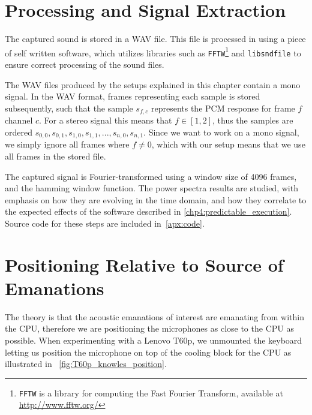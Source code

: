 \section{Processing and Signal Extraction}\label{chp3:sec:processing_signal_extraction}
The captured sound is stored in a WAV file.
This file is processed in using a piece of self written software, which utilizes libraries such as \texttt{FFTW}\footnote{\texttt{FFTW} is a library for computing the Fast Fourier Transform, available at \url{http://www.fftw.org/}} and \texttt{libsndfile}\footnotemark{} to ensure correct processing of the sound files.


The WAV files produced by the setups explained in this chapter contain a mono signal. 
In the WAV format, frames representing each sample is stored subsequently, such that the sample \( s_{f,c} \) represents the \gls{PCM} response for frame \( f \) channel \( c \).
For a stereo signal this means that \( f \in \left [ 1, 2 \right ] \), thus the samples are ordered  \( s_{0,0}, s_{0,1}, s_{1,0}, s_{1,1}, ... , s_{n,0}, s_{n,1} \).
Since we want to work on a mono signal, we simply ignore all frames where \( f \neq 0 \), which with our setup means that we use all frames in the stored file.

The captured signal is Fourier-transformed using a window size of 4096 frames, and the hamming window function. The power spectra results are studied, with emphasis on how they are evolving in the time domain, and how they correlate to the expected effects of the software described in \autoref{chp4:predictable_execution}.
Source code for these steps are included in~\autoref{apx:code}.

\section{Positioning Relative to Source of Emanations}\label{chp3:sec:capturing_audio_fingerprint}
The theory is that the acoustic emanations of interest are emanating from within the \gls{CPU}, therefore we are positioning the microphones as close to the \gls{CPU} as possible. 
When experimenting with a Lenovo T60p, we unmounted the keyboard letting us position the microphone on top of the cooling block for the \gls{CPU} as illustrated in ~\autoref{fig:T60p_knowles_position}.

